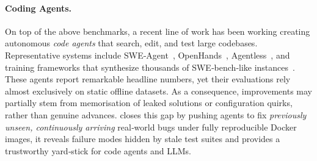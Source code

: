 \paragraph{Coding Agents.}
On top of the above benchmarks, a recent line of work has been working creating autonomous \emph{code agents} that search, edit, and test large codebases.  Representative systems include SWE‑Agent~\cite{yang2024swe}, OpenHands~\cite{openhands}, Agentless~\cite{xia2024agentless}, and training frameworks that synthesize thousands of SWE‑bench‑like instances~\cite{pan2024trainingsoftwareengineeringagents,yang2025swesmith,xie2025swe}.  These agents report remarkable headline numbers, yet their evaluations rely almost exclusively on static offline datasets.  As a consequence, improvements may partially stem from memorisation of leaked solutions or configuration quirks, rather than genuine advances. \benchmark closes this gap by pushing agents to fix \emph{previously unseen, continuously arriving} real‑world bugs under fully reproducible Docker images, it reveals failure modes hidden by stale test suites and provides a trustworthy yard‑stick for code agents and LLMs.





